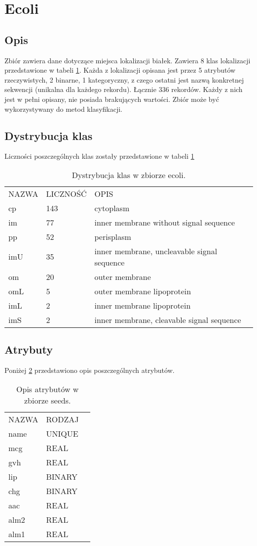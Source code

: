 \section{Ecoli}
	\subsection{Opis}
Zbiór zawiera dane dotyczące miejsca lokalizacji białek. Zawiera 8 klas lokalizacji przedstawione w tabeli \ref{dist-ecoli}. Każda z lokalizacji opisana jest przez 5 atrybutów rzeczywistych, 2 binarne, 1 kategoryczny, z czego ostatni jest nazwą konkretnej sekwencji (unikalna dla każdego rekordu). Łącznie 336 rekordów. Każdy z nich jest w pełni opisany, nie posiada brakujących wartości. Zbiór może być wykorzystywany do metod klasyfikacji.
	\subsection{Dystrybucja klas}
	Liczności poszczególnych klas zostały przedstawione w tabeli \ref{dist-ecoli}
\begin{table}[H]
\centering
\caption{Dystrybucja klas w zbiorze ecoli.}
\label{dist-ecoli}
\begin{tabular}{lll}
NAZWA & LICZNOŚĆ & OPIS \\
cp	& 143	& cytoplasm\\
im	& 77	& inner membrane without signal sequence\\
pp	& 52	& perisplasm\\
imU	& 35	& inner membrane, uncleavable signal sequence\\
om	& 20	& outer membrane\\
omL	& 5	 & outer membrane lipoprotein\\
imL	& 2	 & inner membrane lipoprotein\\
imS	& 2	 & inner membrane, cleavable signal sequence
\end{tabular}
\end{table}
	\subsection{Atrybuty}
	Poniżej \ref{attr-ecoli} przedstawiono opis poszczególnych atrybutów.
\begin{table}[H]
\centering
\caption{Opis atrybutów w zbiorze seeds.}
\label{attr-ecoli}
\begin{tabular}{lll}
NAZWA    	& RODZAJ \\
name	& UNIQUE	\\
mcg	& REAL \\
gvh & REAL \\
lip		& BINARY \\
chg	& BINARY \\
aac	& REAL \\
alm2	& REAL \\
alm1	& REAL
\end{tabular}
\end{table}
